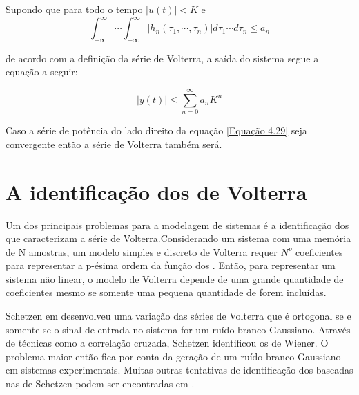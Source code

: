 Supondo que para todo o tempo
$|u(t)| < K$ e $$\int_{-\infty}^{\infty} \cdots\int_{-\infty}^{\infty} |h_{n}(\tau_{1},\cdots,\tau_{n})| d\tau_{1}\cdots d\tau_{n} \leq a_{n}$$

de acordo com a definição da série de Volterra, a saída do sistema segue a equação a seguir:

\begin{equation}
|y(t)| \leq \sum_{n = 0}^{\infty}a_{n}K^{n}
\label{Equação 4.29}
\end{equation}

Caso a série de potência do lado direito da equação \ref{Equação 4.29} seja convergente então a série de Volterra também será.

\section*{A identificação dos  de Volterra}
Um dos principais problemas para a modelagem de sistemas é a identificação dos  que caracterizam a série de Volterra.Considerando um sistema com uma memória de N amostras, um modelo simples e discreto de Volterra requer $N^{p}$ coeficientes para representar a p-ésima ordem da função dos . Então, para representar um sistema não linear, o modelo de Volterra depende de uma grande quantidade de coeficientes mesmo se somente uma pequena quantidade de  forem incluídas.

Schetzen em \cite{schetzen1974theory} desenvolveu uma variação das séries de Volterra que é ortogonal se e somente se o sinal de entrada no sistema for um ruído branco Gaussiano. Através de técnicas como a correlação cruzada, Schetzen identificou os  de Wiener. O problema maior então fica por conta da geração de um ruído branco Gaussiano em sistemas experimentais.
Muitas outras tentativas de identificação dos  baseadas nas de Schetzen podem ser encontradas em \cite{cheng2017volterra}.
